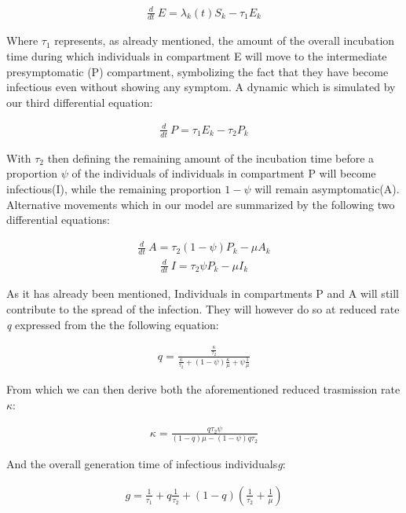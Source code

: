\documentclass[../main.tex]{subfiles}
\begin{document}
\begin{align}
\frac{d}{dt}~E = \lambda_{k}(t) S_{k} - \tau_{1} E_{k}
\end{align}

Where $\tau_{1}$ represents, as already mentioned, the amount of the overall incubation time during which individuals in compartment E will move to the intermediate presymptomatic (P) compartment, symbolizing the fact that they have become infectious even without showing any symptom. A dynamic which is simulated by our third differential equation:

\begin{align}
\frac{d}{dt}~P = \tau_{1}  E_{k} - \tau_{2}  P_{k}
\end{align}

With $\tau_{2}$ then defining the remaining amount of the incubation time before a proportion $\psi$ of the individuals of individuals in compartment P will become infectious(I), while the remaining proportion $1-\psi$ will remain asymptomatic(A). Alternative movements which in our model are summarized by the following two differential equations:

\begin{align}
\frac{d}{dt}~A = \tau_{2}(1-\psi)  P_{k} - \mu  A_{k}
\end{align}
\begin{align}
\frac{d}{dt}~I = \tau_{2}  \psi  P_{k} - \mu  I_{k}
\end{align}

As it has already been mentioned, Individuals in compartments P and A will still contribute to the spread of the infection. They will however do so at reduced rate \textit{q} expressed from the the following equation:

\begin{align}
q = \frac{\frac{\kappa}{\tau_{2}}}{\frac{\kappa}{\tau_{2}}+(1-\psi)\frac{\kappa}{\mu}+\psi\frac{1}{\mu}}
\end{align}

From which we can then derive both the aforementioned reduced trasmission rate $\kappa$:

\begin{align}
\kappa = \frac{q\tau_{2}\psi}{(1-q)\mu-(1-\psi)q\tau_{2}}
\end{align}

And the overall generation time of infectious individuals\textit{g}:

\begin{align}
\textit{g} = \frac{1}{\tau_{1}}+\textit{q}\frac{1}{\tau_{2}}+(1-\textit{q})(\frac{1}{\tau_{2}}+\frac{1}{\mu})
\end{align}
\end{document}
